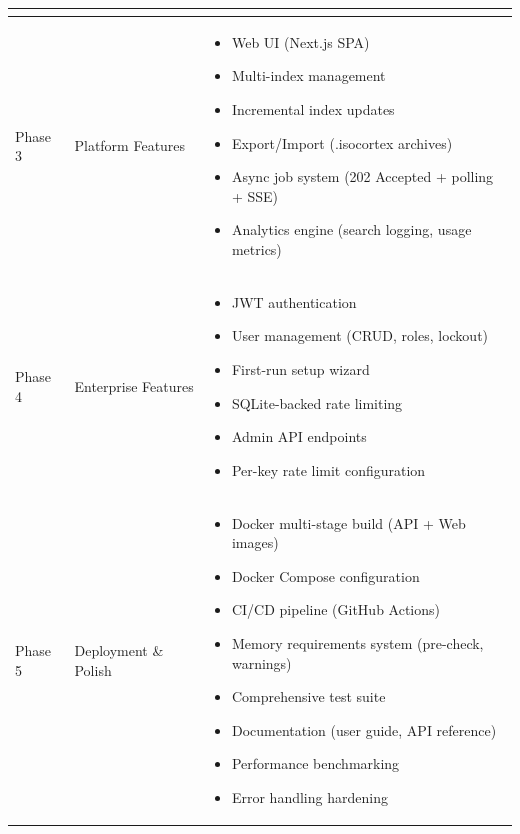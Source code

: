 \documentclass[11pt,a4paper]{article}
\begin{document}
\begin{reqbox}
\begin{longtable}{@{}p{2.5cm}p{3.5cm}p{8.5cm}@{}}
\begin{itemize}[nosep]
\end{itemize} \\
\midrule
Phase 3 & Platform Features &
\begin{itemize}[nosep]
    \item Web UI (Next.js SPA)
    \item Multi-index management
    \item Incremental index updates
    \item Export/Import (.isocortex archives)
    \item Async job system (202 Accepted + polling + SSE)
    \item Analytics engine (search logging, usage metrics)
\end{itemize} \\
\midrule
Phase 4 & Enterprise Features &
\begin{itemize}[nosep]
    \item JWT authentication
    \item User management (CRUD, roles, lockout)
    \item First-run setup wizard
    \item SQLite-backed rate limiting
    \item Admin API endpoints
    \item Per-key rate limit configuration
\end{itemize} \\
\midrule
Phase 5 & Deployment \& Polish &
\begin{itemize}[nosep]
    \item Docker multi-stage build (API + Web images)
    \item Docker Compose configuration
    \item CI/CD pipeline (GitHub Actions)
    \item Memory requirements system (pre-check, warnings)
    \item Comprehensive test suite
    \item Documentation (user guide, API reference)
    \item Performance benchmarking
    \item Error handling hardening
\end{itemize} \\
\bottomrule
\end{longtable}
\end{reqbox}

\end{document}
